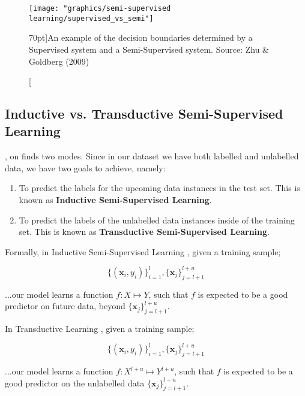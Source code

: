 \begin{figure}
\texttt{[image: "graphics/semi-supervised learning/supervised\_vs\_semi"]}
\caption[Supervised vs Semi-Supervised Example][70pt]{An example of the decision boundaries determined by a Supervised system and a Semi-Supervised system.  Source: Zhu \& Goldberg (2009)}
\label{fig:super_vs_semi}
\end{figure}

\subsection{Inductive vs. Transductive Semi-Supervised Learning}\label{sec:inductive_transductive}

, on finds two modes. Since in our dataset we have both labelled and unlabelled data, we have two goals to achieve, namely:

\begin{enumerate}
\item To predict the labels for the upcoming data instances in the test set. This is known as \textbf{Inductive Semi-Supervised Learning}.
\item To predict the labels of the unlabelled data instances inside of the training set. This is known as \textbf{Transductive Semi-Supervised Learning}.
\end{enumerate}

Formally, in Inductive Semi-Supervised Learning \citep{zhu2009introduction}, given a training sample; 

\begin{equation}
\{(\bm{x}_i, y_i)\}^{l}_{i=1},\{\bm{x}_j\}^{l+u}_{j=l+1}
\end{equation}

...our model learns a function $f:X \mapsto Y$, such that $f$ is expected to be a good predictor on future data, beyond $\{\bm{x}_j\}^{l+u}_{j=l+1}$.

In Transductive Learning \citep{zhu2009introduction}, given a training sample;

\begin{equation}
\{(\bm{x}_i,y_i)\}^l_{i=1},\{\bm{x}_j\}^{l+u}_{j=l+1}
\end{equation}

...our model learns a function $f: X^{l+u} \mapsto Y^{l+u}$, such that $f$ is expected to be a good predictor on the unlabelled data $\{\bm{x}_j\}^{l+u}_{j=l+1}$.

